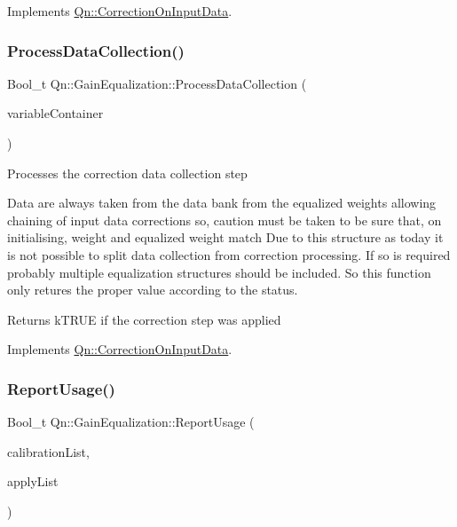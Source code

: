 Implements \mbox{\hyperlink{classQn_1_1CorrectionOnInputData_a42390a6c47f558faeb1e14d245dcbc4a}{Qn\+::\+Correction\+On\+Input\+Data}}.

\mbox{\label{classQn_1_1GainEqualization_a9984ec9a1056bc3e336ff9ac50888641}} 
\subsubsection{\texorpdfstring{Process\+Data\+Collection()}{ProcessDataCollection()}}
{\footnotesize\ttfamily Bool\+\_\+t Qn\+::\+Gain\+Equalization\+::\+Process\+Data\+Collection (\begin{DoxyParamCaption}\item[{const double $\ast$}]{variable\+Container }\end{DoxyParamCaption})\hspace{0.3cm}{\ttfamily [virtual]}}

Processes the correction data collection step

Data are always taken from the data bank from the equalized weights allowing chaining of input data corrections so, caution must be taken to be sure that, on initialising, weight and equalized weight match Due to this structure as today it is not possible to split data collection from correction processing. If so is required probably multiple equalization structures should be included. So this function only retures the proper value according to the status. \begin{DoxyReturn}{Returns}
k\+T\+R\+UE if the correction step was applied 
\end{DoxyReturn}


Implements \mbox{\hyperlink{classQn_1_1CorrectionOnInputData_aff000eb0dbd571ac42eb0c4d3771ba69}{Qn\+::\+Correction\+On\+Input\+Data}}.

\mbox{\label{classQn_1_1GainEqualization_af444038af10eb53d8bd6c8703d4e5629}} 
\subsubsection{\texorpdfstring{Report\+Usage()}{ReportUsage()}}
{\footnotesize\ttfamily Bool\+\_\+t Qn\+::\+Gain\+Equalization\+::\+Report\+Usage (\begin{DoxyParamCaption}\item[{T\+List $\ast$}]{calibration\+List,  }\item[{T\+List $\ast$}]{apply\+List }\end{DoxyParamCaption})\hspace{0.3cm}{\ttfamily [virtual]}}

